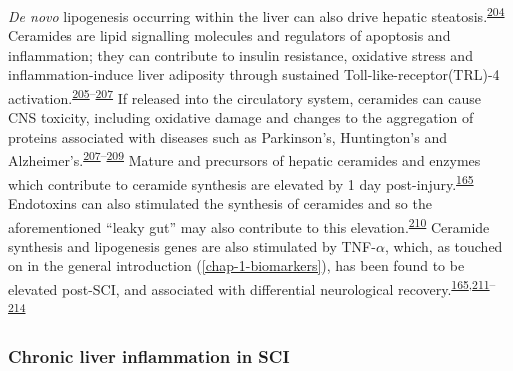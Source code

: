 \documentclass[
]{article}
\begin{document}
\emph{De novo} lipogenesis occurring within the liver can also drive hepatic steatosis.\textsuperscript{\protect\hyperlink{ref-lavoie_regulation_2006}{204}}
Ceramides are lipid signalling molecules and regulators of apoptosis and inflammation; they can contribute to insulin resistance, oxidative stress and inflammation-induce liver adiposity through sustained Toll-like-receptor(TRL)-4 activation.\textsuperscript{\protect\hyperlink{ref-schilling_palmitate_2013}{205}--\protect\hyperlink{ref-pagadala_role_2012}{207}}
If released into the circulatory system, ceramides can cause CNS toxicity, including oxidative damage and changes to the aggregation of proteins associated with diseases such as Parkinson's, Huntington's and Alzheimer's.\textsuperscript{\protect\hyperlink{ref-pagadala_role_2012}{207}--\protect\hyperlink{ref-czubowicz_role_2019}{209}}
Mature and precursors of hepatic ceramides and enzymes which contribute to ceramide synthesis are elevated by 1 day post-injury.\textsuperscript{\protect\hyperlink{ref-sauerbeck_spinal_2015}{165}}
Endotoxins can also stimulated the synthesis of ceramides and so the aforementioned ``leaky gut'' may also contribute to this elevation.\textsuperscript{\protect\hyperlink{ref-chang_endotoxin_2011}{210}}
Ceramide synthesis and lipogenesis genes are also stimulated by TNF-\(\alpha\), which, as touched on in the general introduction (\ref{chap-1-biomarkers}), has been found to be elevated post-SCI, and associated with differential neurological recovery.\textsuperscript{\protect\hyperlink{ref-sauerbeck_spinal_2015}{165},\protect\hyperlink{ref-davies_clinical_2007}{211}--\protect\hyperlink{ref-bikman_role_2012}{214}}

\hypertarget{chronic-liver-inflammation-in-sci}{%
\subsubsection{Chronic liver inflammation in SCI}\label{chronic-liver-inflammation-in-sci}}
\end{document}
